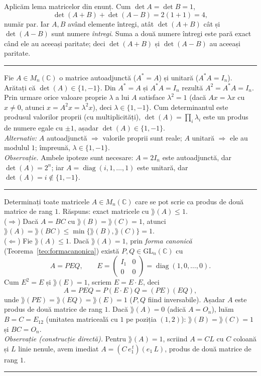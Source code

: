 \sol Aplicăm lema matricelor din enunț. Cum $\det A=\det B=1$,
\[ \det(A+B)+\det(A-B)=2(1+1)=4, \]
număr par. Iar $A,B$ având elemente întregi, atât $\det(A+B)$ cât și $\det(A-B)$ sunt numere \emph{întregi}. Suma a două numere întregi este pară exact când ele au aceeași paritate; deci $\det(A+B)$ și $\det(A-B)$ au aceeași paritate.
\vspace{1mm}\hrule

Fie $A\in M_n(\mathbb{C})$ o matrice autoadjunctă ($A^*=A$) și unitară ($A^*A=I_n$). Arătați că $\det(A)\in\{1,-1\}$.
\sol Din $A^*=A$ și $A^*A=I_n$ rezultă $A^2=A^*A=I_n$. Prin urmare orice valoare proprie $\lambda$ a lui $A$ satisface $\lambda^2=1$ (dacă $Ax=\lambda x$ cu $x\neq0$, atunci $x=A^2x=\lambda^2x$), deci $\lambda\in\{1,-1\}$. Cum determinantul este produsul valorilor proprii (cu multiplicități), $\det(A)=\prod_i\lambda_i$ este un produs de numere egale cu $\pm1$, așadar $\det(A)\in\{1,-1\}$.\\[2pt]
\emph{Alternativ:} $A$ autoadjunctă $\Rightarrow$ valorile proprii sunt reale; $A$ unitară $\Rightarrow$ ele au modulul $1$; împreună, $\lambda\in\{1,-1\}$.\\[2pt]
\emph{Observație.} Ambele ipoteze sunt necesare: $A=2I_n$ este autoadjunctă, dar $\det(A)=2^n$; iar $A=\operatorname{diag}(i,1,\dots,1)$ este unitară, dar $\det(A)=i\notin\{1,-1\}$.
\vspace{1mm}\hrule

Determinați toate matricele $A\in M_n(\mathbb{C})$ care se pot scrie ca produs de două matrice de rang $1$.
\sol Răspuns: exact matricele cu $\rang(A)\le1$.\\[2pt]
($\Rightarrow$) Dacă $A=BC$ cu $\rang(B)=\rang(C)=1$, atunci $\rang(A)=\rang(BC)\le\min\{\rang(B),\rang(C)\}=1$.\\[2pt]
($\Leftarrow$) Fie $\rang(A)\le1$. Dacă $\rang(A)=1$, prin \emph{forma canonică} (Teorema~\ref{teo:formacanonica}) există $P,Q\in\mathrm{GL}_n(\mathbb{C})$ cu
\[ A=PEQ,\qquad E=\begin{pmatrix} I_1 & 0\\ 0 & 0\end{pmatrix}=\operatorname{diag}(1,0,\dots,0). \]
Cum $E^2=E$ și $\rang(E)=1$, scriem $E=E\cdot E$, deci
\[ A=PEQ=P(E\cdot E)Q=(PE)(EQ), \]
unde $\rang(PE)=\rang(EQ)=\rang(E)=1$ ($P,Q$ fiind inversabile). Așadar $A$ este produs de două matrice de rang $1$. Dacă $\rang(A)=0$ (adică $A=O_n$), luăm $B=C=E_{12}$ (unitatea matriceală cu $1$ pe poziția $(1,2)$): $\rang(B)=\rang(C)=1$ și $BC=O_n$.\\[2pt]
\emph{Observație (construcție directă).} Pentru $\rang(A)=1$, scriind $A=CL$ cu $C$ coloană și $L$ linie nenule, avem imediat $A=(C\,e_1^{\,t})(e_1\,L)$, produs de două matrice de rang $1$.
\vspace{1mm}\hrule

